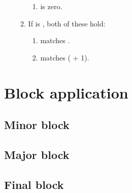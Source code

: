 \documentclass[../hydrozoa.tex]{subfiles}
\begin{document}
\begin{enumerate}
\begin{enumerate}
\begin{enumerate}
          \item {} is zero.
        \end{enumerate}
      \item If  is , both of these hold:
        \begin{enumerate}
          \item {} matches .
          \item {} matches ( + 1).
        \end{enumerate}
    \end{enumerate}
\end{enumerate}

\section{Block application}%
\label{h:l2-block-application}%


\subsection{Minor block}%
\label{h:l2-block-application-minor}%


\subsection{Major block}%
\label{h:l2-block-application-major}%


\subsection{Final block}%
\label{h:l2-block-application-final}%

\end{document}

